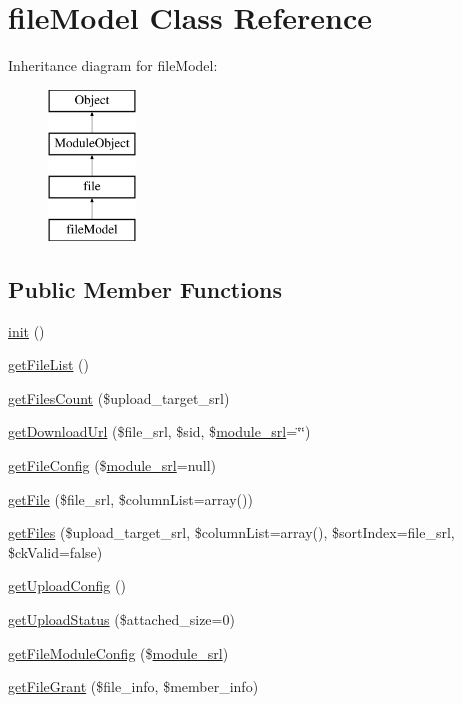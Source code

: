 \hypertarget{classfileModel}{}\section{file\+Model Class Reference}
\label{classfileModel}
Inheritance diagram for file\+Model\+:\begin{figure}[H]
\begin{center}
\leavevmode
\includegraphics[height=4.000000cm]{classfileModel}
\end{center}
\end{figure}
\subsection*{Public Member Functions}
\begin{DoxyCompactItemize}
\item 
\hyperlink{classfileModel_a5dd9542d5c0ed61a7dd0158900ff5c92}{init} ()
\item 
\hyperlink{classfileModel_ad2b29057d5e61a15cb2caf794fc12291}{get\+File\+List} ()
\item 
\hyperlink{classfileModel_a37f83c04ce8adc09f576b94e04264f5b}{get\+Files\+Count} (\$upload\+\_\+target\+\_\+srl)
\item 
\hyperlink{classfileModel_ad626512a63e99f97d0e5a6fac7dae8c8}{get\+Download\+Url} (\$file\+\_\+srl, \$sid, \$\hyperlink{ko_8install_8php_a370bb6450fab1da3e0ed9f484a38b761}{module\+\_\+srl}=\char`\"{}\char`\"{})
\item 
\hyperlink{classfileModel_a81beeda11f761f561adb60ebc72d6187}{get\+File\+Config} (\$\hyperlink{ko_8install_8php_a370bb6450fab1da3e0ed9f484a38b761}{module\+\_\+srl}=null)
\item 
\hyperlink{classfileModel_a1475f2eb6cc740bf7f5ef67a4654fb24}{get\+File} (\$file\+\_\+srl, \$column\+List=array())
\item 
\hyperlink{classfileModel_ad311bb965a415b2e95253cdbd23c5406}{get\+Files} (\$upload\+\_\+target\+\_\+srl, \$column\+List=array(), \$sort\+Index=\textquotesingle{}file\+\_\+srl\textquotesingle{}, \$ck\+Valid=false)
\item 
\hyperlink{classfileModel_a0d268e1f840c7495de96ed511c7053fc}{get\+Upload\+Config} ()
\item 
\hyperlink{classfileModel_a63c3d6b41db33e55521cd3f0b10ab493}{get\+Upload\+Status} (\$attached\+\_\+size=0)
\item 
\hyperlink{classfileModel_aefe867916bce4a5f3451bb9afc464844}{get\+File\+Module\+Config} (\$\hyperlink{ko_8install_8php_a370bb6450fab1da3e0ed9f484a38b761}{module\+\_\+srl})
\item 
\hyperlink{classfileModel_a129e251c2a4ed575126c902a64ed3f59}{get\+File\+Grant} (\$file\+\_\+info, \$member\+\_\+info)
\end{DoxyCompactItemize}
